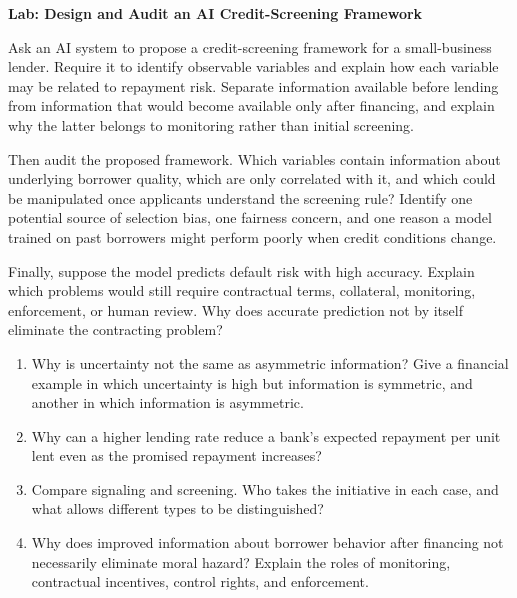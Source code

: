 

\textbf{Lab: Design and Audit an AI Credit-Screening Framework}

Ask an AI system to propose a credit-screening framework for a small-business lender. Require it to identify observable variables and explain how each variable may be related to repayment risk. Separate information available before lending from information that would become available only after financing, and explain why the latter belongs to monitoring rather than initial screening.

Then audit the proposed framework. Which variables contain information about underlying borrower quality, which are only correlated with it, and which could be manipulated once applicants understand the screening rule? Identify one potential source of selection bias, one fairness concern, and one reason a model trained on past borrowers might perform poorly when credit conditions change.

Finally, suppose the model predicts default risk with high accuracy. Explain which problems would still require contractual terms, collateral, monitoring, enforcement, or human review. Why does accurate prediction not by itself eliminate the contracting problem?



\begin{enumerate}

\item Why is uncertainty not the same as asymmetric information? Give a financial example in which uncertainty is high but information is symmetric, and another in which information is asymmetric.

\item Why can a higher lending rate reduce a bank's expected
repayment per unit lent even as the promised repayment increases?

\item Compare signaling and screening. Who takes the initiative in each case, and what allows different types to be distinguished?

\item Why does improved information about borrower behavior
after financing not necessarily eliminate moral hazard?
Explain the roles of monitoring, contractual incentives,
control rights, and enforcement.
\end{enumerate}

